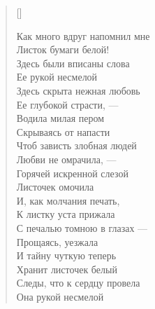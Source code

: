 \settowidth{\versewidth}{Как много вдруг напомнил мне}
\begin{verse}[\versewidth]
\begin{altverse}
Как много вдруг напомнил мне\\
     Листок бумаги белой!\\
Здесь были вписаны слова \\
     Ее рукой несмелой\ldotst\\
Здесь скрыта нежная любовь\\
     Ее глубокой страсти, ---\\
Водила милая пером\\
     Скрываясь от напасти\ldotst\\
Чтоб зависть злобная людей\\
     Любви не омрачила, ---\\
Горячей искренной слезой\\
     Листочек омочила\ldotst\\
И, как молчания печать,\\
     К листку уста прижала\ldotst\\
С печалью томною в глазах ---\\
     Прощаясь, уезжала\ldotst\\
И тайну чуткую теперь\\
     Хранит листочек белый\\
Следы, что к сердцу провела\\
     Она рукой несмелой\ldotst\\
\end{altverse}
\end{verse}

\newpage
\vspace*{0cm}


